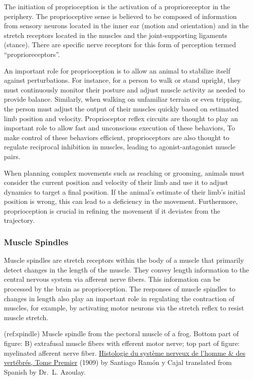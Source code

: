 The initiation of proprioception is the activation of a proprioreceptor
in the periphery. The proprioceptive sense is believed to be composed of
information from sensory neurons located in the inner ear (motion and
orientation) and in the stretch receptors located in the muscles and the
joint-supporting ligaments (stance). There are specific nerve receptors
for this form of perception termed ``proprioreceptors''.

An important role for proprioception is to allow an animal to stabilize
itself against perturbations. For instance, for a person to walk or
stand upright, they must continuously monitor their posture and adjust
muscle activity as needed to provide balance. Similarly, when walking on
unfamiliar terrain or even tripping, the person must adjust the output
of their muscles quickly based on estimated limb position and velocity.
Proprioceptor reflex circuits are thought to play an important role to
allow fast and unconscious execution of these behaviors, To make control
of these behaviors efficient, proprioceptors are also thought to
regulate reciprocal inhibition in muscles, leading to agonist-antagonist
muscle pairs.

When planning complex movements such as reaching or grooming, animals
must consider the current position and velocity of their limb and use it
to adjust dynamics to target a final position. If the animal's estimate
of their limb's initial position is wrong, this can lead to a deficiency
in the movement. Furthermore, proprioception is crucial in refining the
movement if it deviates from the trajectory.

\hypertarget{muscle-spindles}{%
\subsubsection{Muscle Spindles}\label{muscle-spindles}}

Muscle spindles are stretch receptors within the body of a muscle that
primarily detect changes in the length of the muscle. They convey length
information to the central nervous system via afferent nerve fibers.
This information can be processed by the brain as proprioception. The
responses of muscle spindles to changes in length also play an important
role in regulating the contraction of muscles, for example, by
activating motor neurons via the stretch reflex to resist muscle
stretch.

(ref:spindle) Muscle spindle from the pectoral muscle of a frog. Bottom
part of figure: B) extrafusal muscle fibers with efferent motor nerve;
top part of figure: myelinated afferent nerve fiber.
\href{https://wellcomelibrary.org/item/b2129592x\#?c=0\&m=0\&s=0\&cv=14\&z=0\%2C-3.48\%2C1\%2C8.6591}{Histologie
du système nerveux de l'homme \& des vertébrés, Tome Premier} (1909) by
Santiago Ramón y Cajal translated from Spanish by Dr.~L. Azoulay.

